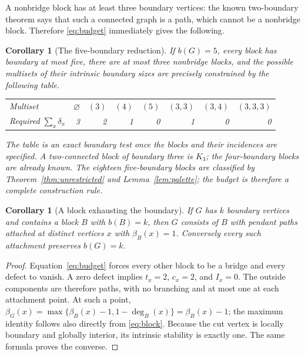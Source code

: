 \documentclass[11pt,a4paper]{article}
\newtheorem{corollary}[theorem]{Corollary}
\theoremstyle{definition}\newtheorem{definition}[theorem]{Definition}
\theoremstyle{remark}\newtheorem{remark}[theorem]{Remark}
\newcommand{\stab}{\beta}
\newcommand{\dd}{\operatorname{deg}}
\begin{document}
A nonbridge block has at least three boundary vertices: the known
two-boundary theorem says that such a connected graph is a path, which cannot
be a nonbridge block. Therefore \eqref{eq:budget} immediately gives the following.

\begin{corollary}[The five-boundary reduction]\label{cor:five}
If $b(G)=5$, every block has boundary at most five, there are at most three
nonbridge blocks, and the possible multisets of their intrinsic boundary
sizes are precisely constrained by the following table.
\begin{center}
\begin{tabular}{@{}lrrrrrrr@{}}\toprule
Multiset & $\varnothing$ & $(3)$ & $(4)$ & $(5)$ & $(3,3)$ & $(3,4)$ & $(3,3,3)$\\
Required $\sum_x\delta_x$ & 3 & 2 & 1 & 0 & 1 & 0 & 0\\\bottomrule
\end{tabular}
\end{center}
The table is an exact boundary test once the blocks and their incidences are
specified. A two-connected block of boundary three is $K_3$; the
four-boundary blocks are already known. The eighteen five-boundary blocks are classified by Theorem~\ref{thm:unrestricted}
and Lemma~\ref{lem:palette}; the budget is therefore a complete construction rule.
\end{corollary}

\begin{corollary}[A block exhausting the boundary]\label{cor:exhaust}
If $G$ has $k$ boundary vertices and contains a block $B$ with $b(B)=k$, then
$G$ consists of $B$ with pendant paths attached at distinct vertices $x$ with
$\stab_B(x)=1$. Conversely every such attachment preserves $b(G)=k$.
\end{corollary}
\begin{proof}
Equation~\eqref{eq:budget} forces every other block to be a bridge and every
defect to vanish. A zero defect implies $t_x=2$, $c_x=2$, and $I_x=0$.
The outside components are therefore paths, with no branching and at most one
at each attachment point. At such a point,
$\stab_G(x)=\max\{\stab_B(x)-1,1-\dd_B(x)\}=\stab_B(x)-1$;
the maximum identity follows also directly from \eqref{eq:block}.
Because the cut vertex is locally boundary and globally interior, its
intrinsic stability is exactly one. The same formula proves the converse.
\end{proof}
\end{document}
